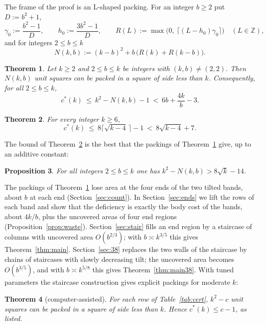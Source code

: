 \documentclass[11pt]{amsart}
\newcommand{\Z}{\mathbb Z}
\newcommand{\cs}{c^{*}}
\newtheorem{theorem}{Theorem}[section]
\newtheorem{proposition}[theorem]{Proposition}
\theoremstyle{definition}
\theoremstyle{remark}
\numberwithin{equation}{section}
\begin{document}
The frame of the proof is an L-shaped packing. For an integer $b\ge2$ put $D:=b^2+1$,
\[
\gamma_0:=\frac{b^2-1}{D},\qquad h_0:=\frac{3b^2-1}{D},\qquad
R(L):=\max\bigl(0,\ \lceil (L-h_0)\gamma_0\rceil\bigr)\quad(L\in\Z),
\]
and for integers $2\le b\le k$
\[
N(k,b):=(k-b)^2+b\,\bigl(R(k)+R(k-b)\bigr).
\]

\begin{theorem}\label{thm:A}
Let $k\ge2$ and $2\le b\le k$ be integers with $(k,b)\ne(2,2)$. Then $N(k,b)$ unit squares can be packed in a square of
side less than $k$. Consequently, for all $2\le b\le k$,
\[
\cs(k)\ \le\ k^2-N(k,b)-1\ <\ 6b+\frac{4k}{b}-3 .
\]
\end{theorem}

\begin{theorem}\label{thm:sqrt}
For every integer $k\ge6$,
\[
\cs(k)\ \le\ 8\bigl\lceil\sqrt{k-4}\,\bigr\rceil-1\ <\ 8\sqrt{k-4}+7 .
\]
\end{theorem}

The bound of Theorem~\ref{thm:sqrt} is the best that the packings of Theorem~\ref{thm:A} give, up to an additive
constant:

\begin{proposition}\label{prop:D}
For all integers $2\le b\le k$ one has $k^2-N(k,b)>8\sqrt k-14$.
\end{proposition}

The packings of Theorem~\ref{thm:A} lose area at the four ends of the two tilted bands, about $b$ at each end
(Section~\ref{sec:count}). In Section~\ref{sec:ends} we lift the rows of each band and show that the deficiency is
exactly the body cost of the bands, about $4k/b$, plus the uncovered areas of four end regions
(Proposition~\ref{prop:waste}). Section~\ref{sec:stair} fills an end region by a staircase of columns with uncovered
area $O(b^{2/3})$; with $b\asymp k^{3/5}$ this gives Theorem~\ref{thm:main}. Section~\ref{sec:38} replaces the two
walls of the staircase by chains of staircases with slowly decreasing tilt; the uncovered area becomes $O(b^{3/5})$,
and with $b\asymp k^{5/8}$ this gives Theorem~\ref{thm:main38}. With tuned parameters the staircase construction gives
explicit packings for moderate $k$:

\begin{theorem}[computer-assisted]\label{thm:cert}
For each row of Table~\ref{tab:cert}, $k^2-c$ unit squares can be packed in a square of side less than $k$. Hence
$\cs(k)\le c-1$, as listed.
\end{theorem}
\end{document}

